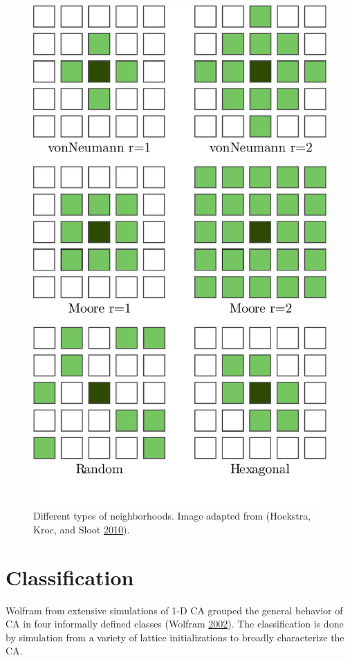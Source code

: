 \documentclass[
]{book}
\begin{document}
\begin{figure}

{\centering \includegraphics[width=0.8\linewidth]{pics/neighborhoods} 

}

\caption{Different types of neighborhoods. Image adapted from (Hoekstra, Kroc, and Sloot \protect\hyperlink{ref-hoekstra2010simulating}{2010}).}\label{fig:CA-neighborhoods}
\end{figure}

\hypertarget{classification}{%
\section{Classification}\label{classification}}

Wolfram from extensive simulations of 1-D CA grouped the general behavior of CA in four informally defined classes (Wolfram \protect\hyperlink{ref-wolfram2002new}{2002}). The classification is done by simulation from a variety of lattice initializations to broadly characterize the CA.
\end{document}
